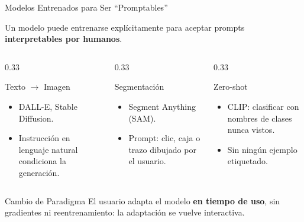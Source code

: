 \documentclass[aspectratio=169, 10pt]{beamer}
\begin{document}
\begin{frame}{Modelos Entrenados para Ser ``Promptables''}

	Un modelo puede entrenarse expl\'icitamente para aceptar prompts \textbf{interpretables por humanos}.

	\vspace{0.3cm}

	\begin{columns}[T]
		\begin{column}{0.33\textwidth}
			\begin{block}{Texto $\to$ Imagen}
				\small
				\begin{itemize}
					\item DALL-E, Stable Diffusion.
					\item Instrucci\'on en lenguaje natural condiciona la generaci\'on.
				\end{itemize}
			\end{block}
		\end{column}

		\begin{column}{0.33\textwidth}
			\begin{block}{Segmentaci\'on}
				\small
				\begin{itemize}
					\item Segment Anything (SAM).
					\item Prompt: clic, caja o trazo dibujado por el usuario.
				\end{itemize}
			\end{block}
		\end{column}

		\begin{column}{0.33\textwidth}
			\begin{block}{Zero-shot}
				\small
				\begin{itemize}
					\item CLIP: clasificar con nombres de clases nunca vistos.
					\item Sin ning\'un ejemplo etiquetado.
				\end{itemize}
			\end{block}
		\end{column}
	\end{columns}

	\vspace{0.4cm}

	\begin{alertblock}{Cambio de Paradigma}
		El usuario adapta el modelo \textbf{en tiempo de uso}, sin gradientes ni reentrenamiento: la adaptaci\'on se vuelve interactiva.
	\end{alertblock}

\end{frame}
\end{document}
